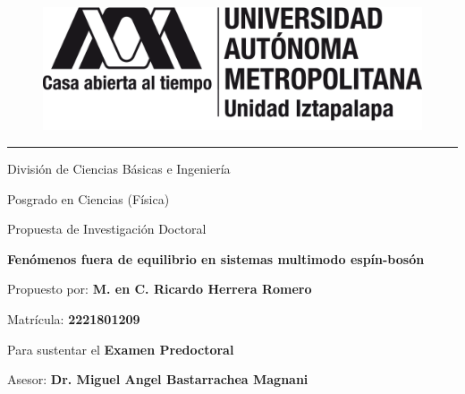 \documentclass[onecolumn,notitlepage,letterpaper,aps,pra,12pt]{article}
\numberwithin{equation}{section}
\begin{document}
 

\clearpage
\thispagestyle{empty}

\begin{titlepage}
\centering
\begin{figure}
    \centering
    \includegraphics[width=4.5 in]{Images/uam.png}
\end{figure}

\vspace{1cm}

{\LARGE \rule{15cm}{1.0mm}  \par}

\centering
\vspace{0.45cm}

{\LARGE División de Ciencias Básicas e Ingeniería}

\centering
\vspace{0.45cm}

{\LARGE Posgrado en Ciencias (Física)}

\centering
\vspace{0.45cm}

{\LARGE Propuesta de Investigación Doctoral}

\vspace{0.25cm}

{\Huge \textbf{Fenómenos fuera de equilibrio en sistemas multimodo espín-bosón}}

\vspace{0.45cm}
{\large Propuesto por: {\bf M. en C. Ricardo Herrera Romero} \par}

\vspace{0.45cm}
{\large Matrícula: {\bf 2221801209} \par}

\vspace{0.45cm}
{\large Para sustentar el {\bf Examen Predoctoral} \par}

\vspace{0.45cm}
{\large Asesor: \textbf{Dr. Miguel Angel Bastarrachea Magnani}  \par}


\end{titlepage}
\end{document}

